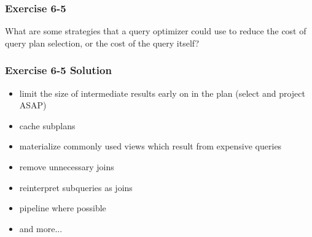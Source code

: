 \begin{frame}
\frametitle{Exercise 6-5}

What are some strategies that a query optimizer could use to reduce the cost of query plan selection, or the cost of the query itself?

\end{frame}


\begin{frame}
\frametitle{Exercise 6-5 Solution}

\begin{itemize}
  \item limit the size of intermediate results early on in the plan (select and project ASAP)
  \item cache subplans
  \item materialize commonly used views which result from expensive queries
  \item remove unnecessary joins
  \item reinterpret subqueries as joins
  \item pipeline where possible
  \item and more...
\end{itemize}

\end{frame}

